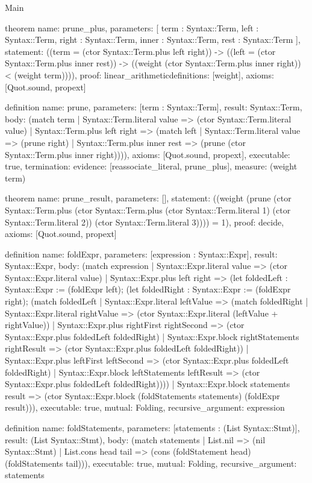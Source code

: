 \begin{lexlean}{Main}
\begin{semanticmodule}
theorem{
  name: prune_plus,
  parameters: [
    term : Syntax::Term,
    left : Syntax::Term,
    right : Syntax::Term,
    inner : Syntax::Term,
    rest : Syntax::Term
  ],
  statement: ((term = (ctor Syntax::Term.plus left right)) -> ((left = (ctor Syntax::Term.plus inner rest)) -> ((weight (ctor Syntax::Term.plus inner right)) < (weight term)))),
  proof: linear_arithmetic{definitions: [weight]},
  axioms: [Quot.sound, propext]
}

definition{
  name: prune,
  parameters: [term : Syntax::Term],
  result: Syntax::Term,
  body: (match term
    | Syntax::Term.literal value => (ctor Syntax::Term.literal value)
    | Syntax::Term.plus left right => (match left
      | Syntax::Term.literal value => (prune right)
      | Syntax::Term.plus inner rest => (prune (ctor Syntax::Term.plus inner right)))),
  axioms: [Quot.sound, propext],
  executable: true,
  termination: {evidence: [reassociate_literal, prune_plus], measure: (weight term)}
}

theorem{
  name: prune_result,
  parameters: [],
  statement: ((weight (prune (ctor Syntax::Term.plus (ctor Syntax::Term.plus (ctor Syntax::Term.literal 1) (ctor Syntax::Term.literal 2)) (ctor Syntax::Term.literal 3)))) = 1),
  proof: decide{},
  axioms: [Quot.sound, propext]
}

definition{
  name: foldExpr,
  parameters: [expression : Syntax::Expr],
  result: Syntax::Expr,
  body: (match expression
    | Syntax::Expr.literal value => (ctor Syntax::Expr.literal value)
    | Syntax::Expr.plus left right => (let foldedLeft : Syntax::Expr := (foldExpr left); (let foldedRight : Syntax::Expr := (foldExpr right); (match foldedLeft
      | Syntax::Expr.literal leftValue => (match foldedRight
        | Syntax::Expr.literal rightValue => (ctor Syntax::Expr.literal (leftValue + rightValue))
        | Syntax::Expr.plus rightFirst rightSecond => (ctor Syntax::Expr.plus foldedLeft foldedRight)
        | Syntax::Expr.block rightStatements rightResult => (ctor Syntax::Expr.plus foldedLeft foldedRight))
      | Syntax::Expr.plus leftFirst leftSecond => (ctor Syntax::Expr.plus foldedLeft foldedRight)
      | Syntax::Expr.block leftStatements leftResult => (ctor Syntax::Expr.plus foldedLeft foldedRight))))
    | Syntax::Expr.block statements result => (ctor Syntax::Expr.block (foldStatements statements) (foldExpr result))),
  executable: true,
  mutual: Folding,
  recursive_argument: expression
}

definition{
  name: foldStatements,
  parameters: [statements : (List Syntax::Stmt)],
  result: (List Syntax::Stmt),
  body: (match statements
    | List.nil => (nil Syntax::Stmt)
    | List.cons head tail => (cons (foldStatement head) (foldStatements tail))),
  executable: true,
  mutual: Folding,
  recursive_argument: statements
}


\end{semanticmodule}
\end{lexlean}
